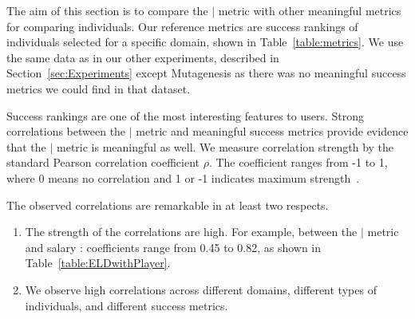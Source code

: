 {The aim of this section is to compare the $\mid$ metric with other meaningful metrics for comparing individuals. Our reference metrics are success rankings of individuals selected for a specific domain, shown in Table~\ref{table:metrics}. We use the same data as in our other experiments, described in Section~\ref{sec:Experiments} except Mutagenesis as there was no meaningful success metrics we could find in that dataset. 

Success rankings are one of the most interesting features to users. Strong correlations between the $\mid$ metric and meaningful success metrics provide evidence that the $\mid$ metric is meaningful as well. We measure correlation strength by the standard Pearson correlation coefficient $\rho$. The coefficient ranges from -1 to 1, where 0 means no correlation and 1 or -1 indicates maximum strength~\citep{Fisher1921}.

The observed correlations are remarkable in at least two respects. 
\begin{enumerate}
\item The strength of the correlations are high. For example, between the $\mid$ metric and salary  : coefficients range from 0.45 to 0.82, as shown in Table~\ref{table:ELDwithPlayer}.
\item We observe high correlations across different domains, different types of individuals, and different success metrics. 
\end{enumerate}


\begin{table}[htbp]
	
	\centering
		\caption{Success metrics and their distributions.\label{table:metrics}}	
	\end{table}



}
